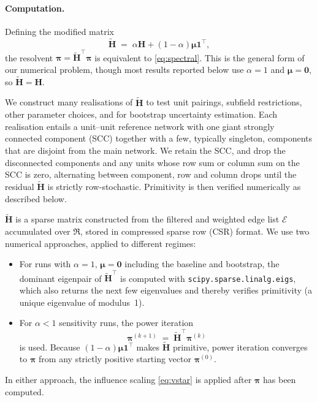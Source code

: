 \paragraph{Computation.}
Defining the modified matrix
\begin{equation}
	\mathbf{\tilde{H}}
	\;=\;
	\alpha\mathbf{H}+(1-\alpha)\boldsymbol{\mu}\mathbf{1}^\top,
	\label{eq:Hstar}
\end{equation}
the resolvent
$\boldsymbol{\pi}=\mathbf{\tilde{H}}^{\top}\boldsymbol{\pi}$
is equivalent to \eqref{eq:spectral}. This is the general form of
our numerical problem, though most results reported below use $\alpha=1$ and $\boldsymbol{\mu}=\mathbf{0}$, so $\mathbf{\tilde{H}}=\mathbf{H}$.

We construct many realisations of $\mathbf{\tilde{H}}$ to test unit pairings, subfield restrictions, other parameter choices, and for bootstrap uncertainty estimation. Each realisation entails a unit--unit reference network with one giant strongly connected component (SCC) together with a few, typically singleton, components that are disjoint from the main network. We retain the SCC, and drop the disconnected components and any units whose row sum or column sum on the SCC is zero, alternating between component, row and column drops until the residual $\mathbf{\tilde{H}}$ is strictly row-stochastic. Primitivity is then verified numerically as described below.

$\mathbf{\tilde{H}}$ is a sparse matrix constructed from the filtered and weighted edge list $\mathcal{E}$ accumulated over $\mathfrak{R}$, stored in compressed sparse row (CSR) format. We use two numerical approaches, applied to different regimes:
\begin{itemize}
	\setlength{\itemsep}{0pt}
	\item For runs with $\alpha=1$, $\boldsymbol{\mu}=\mathbf{0}$ including the baseline and bootstrap, the dominant eigenpair of $\mathbf{\tilde{H}}^\top$ is computed with \texttt{scipy.sparse.linalg.eigs}, which also returns the next few eigenvalues and thereby verifies primitivity (a unique eigenvalue of modulus~1).
	\item For $\alpha<1$ sensitivity runs, the power iteration
\begin{equation}
	\boldsymbol{\pi}^{(k+1)}
	\;=\;
	\mathbf{\tilde{H}}^{\top}\boldsymbol{\pi}^{(k)}
	\label{eq:power}
\end{equation}
is used. Because $(1-\alpha)\boldsymbol{\mu}\mathbf{1}^\top$ makes $\mathbf{\tilde{H}}$ primitive, power iteration converges to $\boldsymbol{\pi}$ from any strictly positive starting vector $\boldsymbol{\pi}^{(0)}$.
\end{itemize}
In either approach, the influence scaling \eqref{eq:vstar} is applied after $\boldsymbol{\pi}$ has been computed.
